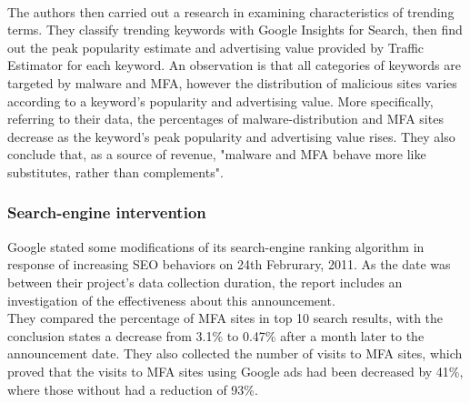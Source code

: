 \paragraph{}
The authors then carried out a research in examining characteristics of 
trending terms. They classify trending keywords with Google Insights for 
Search, then find out the peak popularity estimate and advertising value 
provided by Traffic Estimator for each keyword. An observation is that all 
categories of keywords are targeted by malware and MFA, however the 
distribution of malicious sites varies according to a keyword's popularity and 
advertising value. More specifically, referring to their data, the percentages 
of malware-distribution and MFA sites decrease as the keyword's peak 
popularity and advertising value rises. They also conclude that, as a source 
of revenue, "malware and MFA behave more like substitutes, rather than 
complements".  
\subsubsection{Search-engine intervention}
Google stated some modifications of its search-engine ranking algorithm in 
response of increasing SEO behaviors on 24th Februrary, 2011. As the date was 
between their project's data collection duration, the report includes an 
investigation of the effectiveness about this announcement. \\
They compared the percentage of MFA sites in top 10 search results, with the 
conclusion states a decrease from 3.1\% to 0.47\% after a month later to the 
announcement date. They also collected the number of visits to MFA sites, 
which proved that the visits to MFA sites using Google ads had been decreased 
by 41\%, where those without had a reduction of 93\%. 

